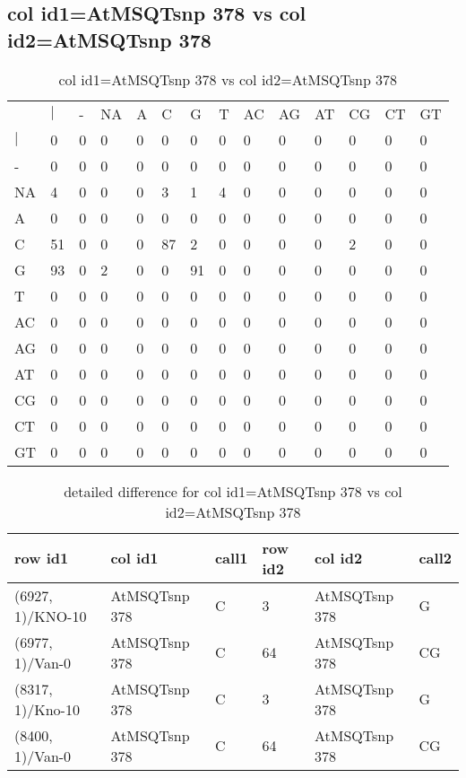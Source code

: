 \subsection{col id1=AtMSQTsnp 378 vs col id2=AtMSQTsnp 378}
\begin{center}
\begin{longtable}{|l|l|l|l|l|l|l|l|l|l|l|l|l|l|}
\caption{col id1=AtMSQTsnp 378 vs col id2=AtMSQTsnp 378} \label{table_dm888}\\
\hline
\\
\hline
&$|$&-&NA&A&C&G&T&AC&AG&AT&CG&CT&GT\\
$|$&0&0&0&0&0&0&0&0&0&0&0&0&0\\
-&0&0&0&0&0&0&0&0&0&0&0&0&0\\
NA&4&0&0&0&3&1&4&0&0&0&0&0&0\\
A&0&0&0&0&0&0&0&0&0&0&0&0&0\\
C&51&0&0&0&87&2&0&0&0&0&2&0&0\\
G&93&0&2&0&0&91&0&0&0&0&0&0&0\\
T&0&0&0&0&0&0&0&0&0&0&0&0&0\\
AC&0&0&0&0&0&0&0&0&0&0&0&0&0\\
AG&0&0&0&0&0&0&0&0&0&0&0&0&0\\
AT&0&0&0&0&0&0&0&0&0&0&0&0&0\\
CG&0&0&0&0&0&0&0&0&0&0&0&0&0\\
CT&0&0&0&0&0&0&0&0&0&0&0&0&0\\
GT&0&0&0&0&0&0&0&0&0&0&0&0&0\\
\hline
\end{longtable}
\end{center}

\begin{center}
\begin{longtable}{|l|l|l|l|l|l|}
\caption{detailed difference for col id1=AtMSQTsnp 378 vs col id2=AtMSQTsnp 378} \label{table_dm889}\\
\hline
row id1&col id1&call1&row id2&col id2&call2\\
\hline
(6927, 1)/KNO-10&AtMSQTsnp 378&C&3&AtMSQTsnp 378&G\\
(6977, 1)/Van-0&AtMSQTsnp 378&C&64&AtMSQTsnp 378&CG\\
(8317, 1)/Kno-10&AtMSQTsnp 378&C&3&AtMSQTsnp 378&G\\
(8400, 1)/Van-0&AtMSQTsnp 378&C&64&AtMSQTsnp 378&CG\\
\hline
\end{longtable}
\end{center}

